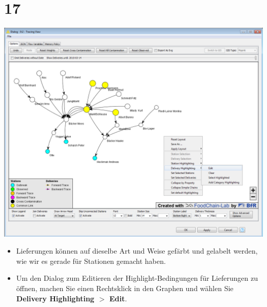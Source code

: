 \documentclass{beamer}
\begin{document}
\section{17}
\begin{frame}
	\begin{center}
  		\includegraphics[height=0.55\textheight]{17.png}
	\end{center}
	\begin{itemize}
		\item Lieferungen können auf dieselbe Art und Weise gefärbt und gelabelt werden, wie wir es gerade für Stationen gemacht haben.
		\item Um den Dialog zum Editieren der Highlight-Bedingungen für Lieferungen zu öffnen, machen Sie einen Rechtsklick in den Graphen und wählen Sie \textbf{Delivery Highlighting $>$ Edit}.
	\end{itemize}
\end{frame}
\end{document}
